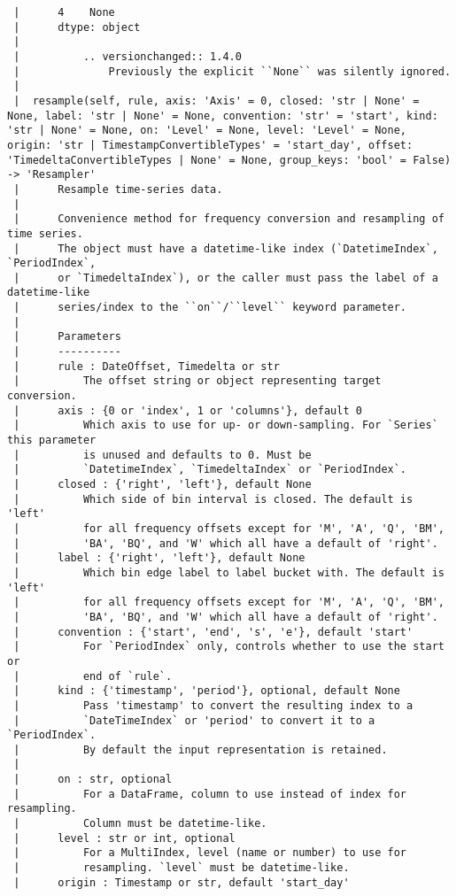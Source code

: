 \documentclass[
  letterpaper,
  DIV=11,
  numbers=noendperiod]{scrreprt}
\begin{document}
\begin{verbatim}
 |      4    None
 |      dtype: object
 |      
 |          .. versionchanged:: 1.4.0
 |              Previously the explicit ``None`` was silently ignored.
 |  
 |  resample(self, rule, axis: 'Axis' = 0, closed: 'str | None' = None, label: 'str | None' = None, convention: 'str' = 'start', kind: 'str | None' = None, on: 'Level' = None, level: 'Level' = None, origin: 'str | TimestampConvertibleTypes' = 'start_day', offset: 'TimedeltaConvertibleTypes | None' = None, group_keys: 'bool' = False) -> 'Resampler'
 |      Resample time-series data.
 |      
 |      Convenience method for frequency conversion and resampling of time series.
 |      The object must have a datetime-like index (`DatetimeIndex`, `PeriodIndex`,
 |      or `TimedeltaIndex`), or the caller must pass the label of a datetime-like
 |      series/index to the ``on``/``level`` keyword parameter.
 |      
 |      Parameters
 |      ----------
 |      rule : DateOffset, Timedelta or str
 |          The offset string or object representing target conversion.
 |      axis : {0 or 'index', 1 or 'columns'}, default 0
 |          Which axis to use for up- or down-sampling. For `Series` this parameter
 |          is unused and defaults to 0. Must be
 |          `DatetimeIndex`, `TimedeltaIndex` or `PeriodIndex`.
 |      closed : {'right', 'left'}, default None
 |          Which side of bin interval is closed. The default is 'left'
 |          for all frequency offsets except for 'M', 'A', 'Q', 'BM',
 |          'BA', 'BQ', and 'W' which all have a default of 'right'.
 |      label : {'right', 'left'}, default None
 |          Which bin edge label to label bucket with. The default is 'left'
 |          for all frequency offsets except for 'M', 'A', 'Q', 'BM',
 |          'BA', 'BQ', and 'W' which all have a default of 'right'.
 |      convention : {'start', 'end', 's', 'e'}, default 'start'
 |          For `PeriodIndex` only, controls whether to use the start or
 |          end of `rule`.
 |      kind : {'timestamp', 'period'}, optional, default None
 |          Pass 'timestamp' to convert the resulting index to a
 |          `DateTimeIndex` or 'period' to convert it to a `PeriodIndex`.
 |          By default the input representation is retained.
 |      
 |      on : str, optional
 |          For a DataFrame, column to use instead of index for resampling.
 |          Column must be datetime-like.
 |      level : str or int, optional
 |          For a MultiIndex, level (name or number) to use for
 |          resampling. `level` must be datetime-like.
 |      origin : Timestamp or str, default 'start_day'

\end{verbatim}
\end{document}
